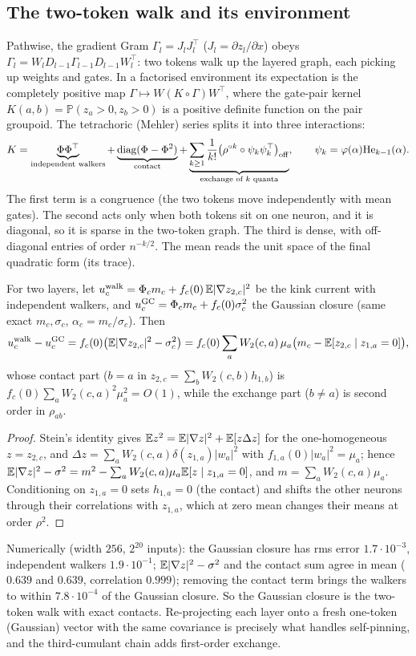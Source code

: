 \subsection{The two-token walk and its environment}
Pathwise, the gradient Gram $\Gamma_l=J_lJ_l^{\top}$ ($J_l=\partial z_l/\partial x$) obeys $\Gamma_l=W_lD_{l-1}\Gamma_{l-1}D_{l-1}W_l^{\top}$: two tokens
walk up the layered graph, each picking up weights and gates. In a factorised environment its expectation is the
completely positive map $\Gamma\mapsto W(K\circ\Gamma)W^{\top}$, where the gate-pair kernel $K(a,b)=\mathbb P(z_a>0,z_b>0)$ is a positive definite
function on the pair groupoid. The tetrachoric (Mehler) series splits it into three interactions:
\[
K=\underbrace{\Phi\Phi^{\top}}_{\text{independent walkers}}+\underbrace{\operatorname{diag}(\Phi-\Phi^2)}_{\text{contact}}+\underbrace{\sum_{k\ge1}\frac{1}{k!}\big(\rho^{\circ k}\circ\psi_k\psi_k^{\top}\big)_{\rm off}}_{\text{exchange of $k$ quanta}},
\qquad\psi_k=\varphi(\alpha)\mathrm{He}_{k-1}(\alpha).
\]
The first term is a congruence (the two tokens move independently with mean gates). The second acts only when both
tokens sit on one neuron, and it is diagonal, so it is sparse in the two-token graph. The third is dense, with
off-diagonal entries of order $n^{-k/2}$. The mean reads the unit space of the final quadratic form (its trace).

\begin{proposition}\label{prop:contactterm}
For two layers, let $u^{\rm walk}_c=\Phi_cm_c+f_c(0)\,\mathbb E|\nabla z_{2,c}|^2$ be the kink current with independent walkers, and
$u^{\rm GC}_c=\Phi_cm_c+f_c(0)\sigma_c^2$ the Gaussian closure (same exact $m_c,\sigma_c$, $\alpha_c=m_c/\sigma_c$). Then
\[
u^{\rm walk}_c-u^{\rm GC}_c=f_c(0)\big(\mathbb E|\nabla z_{2,c}|^2-\sigma_c^2\big)
=f_c(0)\sum_aW_2(c,a)\,\mu_a\big(m_c-\mathbb E[z_{2,c}\mid z_{1,a}=0]\big),
\]
whose contact part ($b=a$ in $z_{2,c}=\sum_bW_2(c,b)h_{1,b}$) is $f_c(0)\sum_aW_2(c,a)^2\mu_a^2=O(1)$, while the exchange part
($b\neq a$) is second order in $\rho_{ab}$.
\end{proposition}
\begin{proof}
Stein's identity gives $\mathbb E z^2=\mathbb E|\nabla z|^2+\mathbb E[z\Delta z]$ for the one-homogeneous $z=z_{2,c}$, and
$\Delta z=\sum_aW_2(c,a)\delta(z_{1,a})|w_a|^2$ with $f_{1,a}(0)|w_a|^2=\mu_a$; hence $\mathbb E|\nabla z|^2-\sigma^2=m^2-\sum_aW_2(c,a)\mu_a\mathbb E[z\mid z_{1,a}=0]$, and
$m=\sum_aW_2(c,a)\mu_a$. Conditioning on $z_{1,a}=0$ sets $h_{1,a}=0$ (the contact) and shifts the other neurons through their
correlations with $z_{1,a}$, which at zero mean changes their means at order $\rho^2$.
\end{proof}
Numerically (width $256$, $2^{20}$ inputs): the Gaussian closure has rms error $1.7\cdot10^{-3}$, independent walkers
$1.9\cdot10^{-1}$; $\mathbb E|\nabla z|^2-\sigma^2$ and the contact sum agree in mean ($0.639$ and $0.639$, correlation $0.999$); removing the contact term
brings the walkers to within $7.8\cdot10^{-4}$ of the Gaussian closure. So the Gaussian closure is the two-token walk with
exact contacts. Re-projecting each layer onto a fresh one-token (Gaussian) vector with the same covariance is precisely
what handles self-pinning, and the third-cumulant chain adds first-order exchange.

